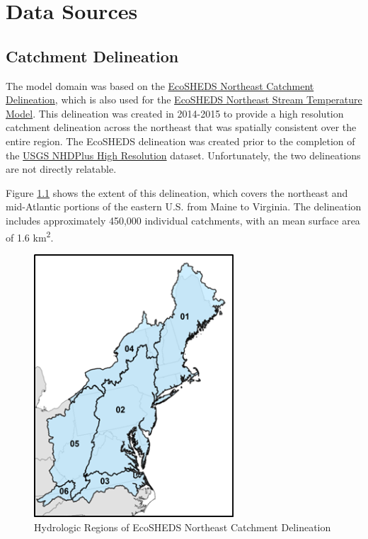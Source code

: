 \documentclass[
]{book}
\begin{document}
\hypertarget{data-sources}{%
\chapter{Data Sources}\label{data-sources}}

\hypertarget{catchment-delineation}{%
\section{Catchment Delineation}\label{catchment-delineation}}

The model domain was based on the \href{https://conte-ecology.github.io/shedsGisData/\#the-national-hydrography-dataset-high-resolution-delineation-version-2-nhdhrdv2}{EcoSHEDS Northeast Catchment Delineation}, which is also used for the \href{https://ecosheds.org/models/stream-temperature/latest/}{EcoSHEDS Northeast Stream Temperature Model}. This delineation was created in 2014-2015 to provide a high resolution catchment delineation across the northeast that was spatially consistent over the entire region. The EcoSHEDS delineation was created prior to the completion of the \href{https://www.usgs.gov/national-hydrography/nhdplus-high-resolution}{USGS NHDPlus High Resolution} dataset. Unfortunately, the two delineations are not directly relatable.

Figure \ref{fig:data-catchments} shows the extent of this delineation, which covers the northeast and mid-Atlantic portions of the eastern U.S. from Maine to Virginia. The delineation includes approximately 450,000 individual catchments, with an mean surface area of 1.6 km\textsuperscript{2}.

\begin{figure}
\includegraphics[width=2.94in]{img/hydrologic-regions} \caption{Hydrologic Regions of EcoSHEDS Northeast Catchment Delineation}\label{fig:data-catchments}
\end{figure}
\end{document}
